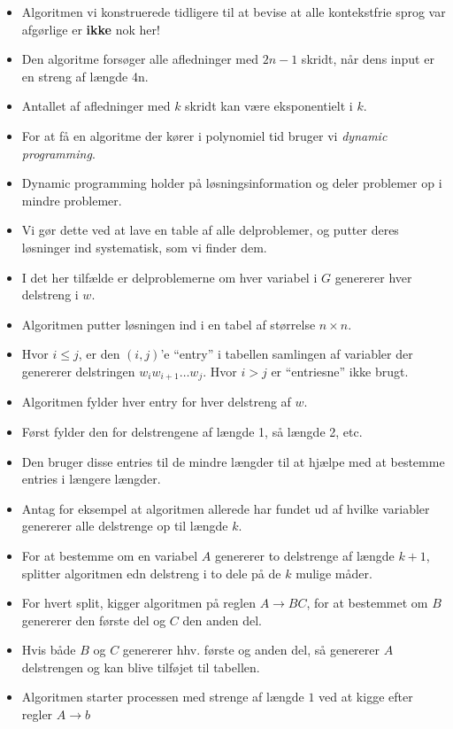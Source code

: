 \begin{frame}[allowframebreaks]
	\begin{itemize}
		\item Algoritmen vi konstruerede tidligere til at bevise at alle kontekstfrie sprog var afgørlige er \textbf{ikke} nok her!
		\item Den algoritme forsøger alle afledninger med $2n-1$ skridt, når dens input er en streng af længde 4n.
		\item Antallet af afledninger med $k$ skridt kan være eksponentielt i $k$.
		\item For at få en algoritme der kører i polynomiel tid bruger vi \textit{dynamic programming}.
		\item Dynamic programming holder på løsningsinformation og deler problemer op i mindre problemer.
		\item Vi gør dette ved at lave en table af alle delproblemer, og putter deres løsninger ind systematisk, som vi finder dem.
		\item I det her tilfælde er delproblemerne om hver variabel i $G$ genererer hver delstreng i $w$.
		\item Algoritmen putter løsningen ind i en tabel af størrelse $n \times n$.
		\item Hvor $i \le j$, er den $(i,j)$'e ``entry'' i tabellen samlingen af variabler der genererer delstringen $w_{i}w_{i+1}\ldots w_{j}$. Hvor $i > j$ er ``entriesne'' ikke brugt.
		\item Algoritmen fylder hver entry for hver delstreng af $w$.
		\item Først fylder den for delstrengene af længde 1, så længde 2, etc.
		\item Den bruger disse entries til de mindre længder til at hjælpe med at bestemme entries i længere længder.
		\item Antag for eksempel at algoritmen allerede har fundet ud af hvilke variabler genererer alle delstrenge op til længde $k$.
		\item For at bestemme om en variabel $A$ genererer to delstrenge af længde $k+1$, splitter algoritmen edn delstreng i to dele på de $k$ mulige måder.
		\item For hvert split, kigger algoritmen på reglen $A \rightarrow BC$, for at bestemmet om $B$ genererer den første del og $C$ den anden del.
		\item Hvis både $B$ og $C$ genererer hhv. første og anden del, så genererer $A$ delstrengen og kan blive tilføjet til tabellen.
		\item Algoritmen starter processen med strenge af længde $1$ ved at kigge efter regler $A \rightarrow b$

\end{itemize}
\end{frame}
